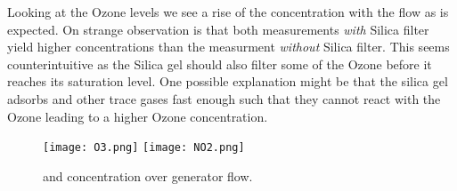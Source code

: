 Looking at the Ozone levels we see a rise of the concentration with
the flow as is expected. On strange observation is that both
measurements \emph{with} Silica filter yield higher concentrations
than the measurment \emph{without} Silica filter. This seems
counterintuitive as the Silica gel should also filter some of the
Ozone before it reaches its saturation level. One possible explanation
might be that the silica gel adsorbs  and other trace gases
fast enough such that they cannot react with the Ozone leading to a
higher Ozone concentration. 

\begin{figure}[htbp]
  \centering
  \texttt{[image: O3.png]}
  \hfill
  \texttt{[image: NO2.png]}
  \caption{ and  concentration over generator flow.}
  \label{fig:o3-flow}
\end{figure}


